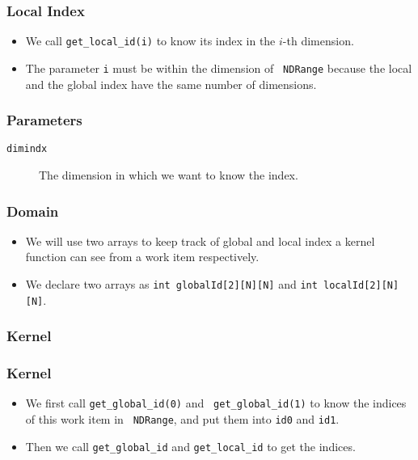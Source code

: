 \documentclass{beamer}
\begin{document}
\begin{frame}
  \frametitle{Local Index}
  \begin{itemize}
    \item We call {\tt get\_local\_id(i)} to know its index in the
      $i$-th dimension.
    \item The parameter {\tt i} must be within the dimension of {\tt
      NDRange} because the local and the global index have the same
      number of dimensions.
  \end{itemize}
\end{frame}

\begin{frame}
\end{frame}

\begin{frame}
  \frametitle{Parameters}
  \begin{description}
  \item [\tt dimindx] The dimension in which we want to know the
    index.
  \end{description}
\end{frame}

\begin{frame}
  \frametitle{Domain}
  \begin{itemize}
    \item We will use two arrays to keep track of global and local
      index a kernel function can see from a work item respectively.
    \item We declare two arrays as {\tt int globalId[2][N][N]} and
      {\tt int localId[2][N][N]}.
  \end{itemize}
\end{frame}

\begin{frame}
  \frametitle{Kernel}
\end{frame}

\begin{frame}
  \frametitle{Kernel}
  \begin{itemize}
  \item We first call {\tt get\_global\_id(0)} and {\tt
    get\_global\_id(1)} to know the indices of this work item in {\tt
    NDRange}, and put them into {\tt id0} and {\tt id1}.
  \item Then we call {\tt get\_global\_id} and {\tt get\_local\_id} to
    get the indices.
  \end{itemize}
\end{frame}
\end{document}
